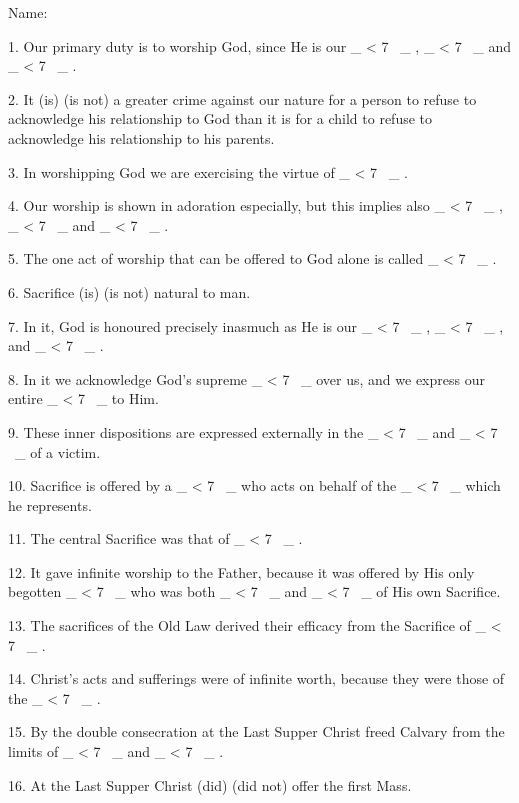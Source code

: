 \documentclass[a5paper]{article}
\title{}
\newcommand\textjarman[1]{{\jarman #1}}
\newcounter{z}
\newcommand\spaces[1]{ \_\loop \ifnum\value{z} < #1
~\_%
\stepcounter{z}%
\repeat%
\setcounter{z}{0}}
\begin{document}
\setlength{\parskip}{6pt plus2pt minus2pt}


\noindent Name:


1. Our primary duty is to worship God, since He is  our  \spaces{7},  \spaces{7}
and \spaces{7}. 

2. It (\textjarman{is}) (\textjarman{is not}) a greater crime against our nature  for  a
person to refuse to acknowledge his relationship to God than  it  is  for  a
child to refuse to acknowledge  his  relationship  to  his  parents.  

3.  In
worshipping God we are exercising the virtue of \spaces{7}. 

4. Our worship  is
shown in adoration especially, but this implies also \spaces{7}, \spaces{7}  and
\spaces{7}. 

5. The one act of worship that can be  offered  to  God  alone  is
called \spaces{7}. 

6. Sacrifice (\textjarman{is}) (\textjarman{is not}) natural to man. 

7.  In  it,  God
is honoured  precisely  inasmuch  as  He  is  our  \spaces{7},  \spaces{7},  and
\spaces{7}. 

8. In it we acknowledge God's supreme \spaces{7}  over  us,  and  we
express our  entire  \spaces{7}  to  Him.  

9.  These  inner  dispositions  are
expressed  externally  in  the  \spaces{7}  and  \spaces{7}  of  a  victim.  

10. Sacrifice is offered by a \spaces{7} who acts on behalf of the \spaces{7}  which
he represents. 

11. The central Sacrifice was that of \spaces{7}. 

12.  It  gave
infinite worship to the Father, because it was offered by His only  begotten
\spaces{7} who was both \spaces{7} and \spaces{7} of His own  Sacrifice.  

13.  The
sacrifices of the Old Law derived  their  efficacy  from  the  Sacrifice  of
\spaces{7}. 

14. Christ's acts and sufferings were of infinite  worth,  because
they were those of the \spaces{7}. 

15. By the double consecration at the  Last
Supper Christ freed Calvary from the limits of \spaces{7}  and  \spaces{7}.  

16. At the Last Supper Christ (\textjarman{did}) (\textjarman{did not}) offer the first Mass. 
\end{document}
